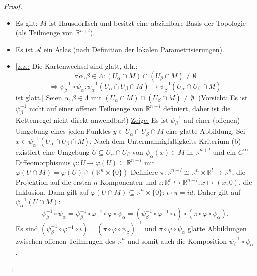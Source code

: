 \documentclass[a4paper,11pt,notitlepage]{report}
\theoremstyle{definition}
\newcommand{\R}{{\ensuremath{\mathbb{R}}}}
\begin{document}
\begin{proof}
	\begin{itemize}
		\item Es gilt: $M$ ist Hausdorffsch und besitzt eine abzählbare Basis der Topologie (als Teilmenge von $\R^{n+l}$).
		\item Es ist $\mathcal{A}$ ein Atlas (nach Definition der lokalen Parametrisierungen).
		\item $[$\underline{z.z.:} Die Kartenwechsel sind glatt, d.h.: 
			$$\forall \alpha, \beta \in \Lambda \colon (U_\alpha \cap M) \cap (U_\beta \cap M) \neq \emptyset$$
			$$\Rightarrow \psi_\beta^{-1} \circ \psi_\alpha \colon \psi_\alpha^{-1}(U_\alpha \cap U_\beta \cap M) \rightarrow \psi_\beta^{-1}(U_\alpha \cap U_\beta \cap M)$$
			 ist glatt.$]$ \newline
			Seien $\alpha, \beta \in \Lambda$ mit $(U_\alpha \cap M) \cap (U_\beta \cap M) \neq \emptyset$.
			\newline
			(\underline{Vorsicht:} Es ist $\psi_\beta^{-1}$ nicht auf einer offenen Teilmenge von $\R^{n+l}$ definiert, daher ist die Kettenregel nicht direkt anwendbar!)
			\newline
			\underline{Zeige:} Es ist $\psi_\beta^{-1}$ auf einer (offenen) Umgebung eines jeden Punktes $y \in U_\alpha \cap U_\beta \cap M$ eine glatte Abbildung.
			\newline
			Sei $x \in \psi_\alpha^{-1}(U_\alpha \cap U_\beta \cap M)$. Nach dem Untermannigfaltigkeits-Kriterium (b) existiert eine Umgebung $U \subseteq U_\alpha \cap U_\beta$ von $\psi_\alpha(x) \in M$ in $\R^{n+l}$ und ein $C^\infty$-Diffeomorphismus $\varphi \colon U \rightarrow \varphi(U) \subseteq \R^{n+l}$ mit $\varphi(U \cap M) = \varphi(U) \cap (\R^{n} \times \{0\})$
			\newline
			Definiere $\pi \colon \R^{n+l} \cong \R^n \times \R^l \rightarrow \R^n$, die Projektion auf die ersten $n$ Komponenten und $\iota \colon \R^n \hookrightarrow \R^{n+l}, x \mapsto (x,0)$, die Inklusion. Dann gilt auf $\varphi(U \cap M) \subseteq \R^{n} \times \{0\}$: $\iota \circ \pi = id$. Daher gilt auf $\psi_\alpha^{-1}(U \cap M)$: 
			$$\psi_\beta^{-1} \circ \psi_\alpha = \psi_\beta^{-1} \circ \varphi^{-1} \circ \varphi \circ \psi_\alpha = (\psi_\beta^{-1} \circ \varphi^{-1} \circ \iota)\circ(\pi \circ \varphi \circ \psi_\alpha).$$
			Es sind $(\psi_\beta^{-1} \circ \varphi^{-1} \circ \iota) = (\pi \circ \varphi \circ \psi_\beta)^{-1}$ und $\pi \circ \varphi \circ \psi_\alpha$ glatte Abbildungen zwischen offenen Teilmengen des $\R^n$ und somit auch die Komposition $\psi_\beta^{-1} \circ \psi_\alpha$.
	\end{itemize}
\end{proof}
\end{document}
